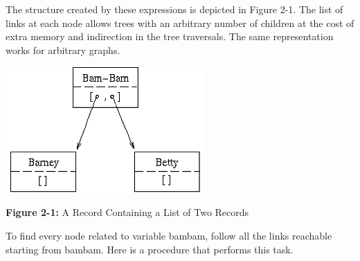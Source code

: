 
The structure created by these expressions is depicted in Figure 2-1.
The list of links at each node allows trees with an arbitrary number of
children at the cost of extra memory and indirection in the tree
traversals. The same representation works for arbitrary
graphs.



\begin{center}
\includegraphics[width=3in,height=1.9in]{ub-img/ub-img6.png}
\end{center}

{\sffamily\bfseries Figure 2-1:}
{\sffamily A Record Containing a List of Two Records}

\bigskip

To find every node related to variable \textsf{bambam}, follow all the
links reachable starting from \textsf{bambam}. Here is a procedure that
performs this task.


